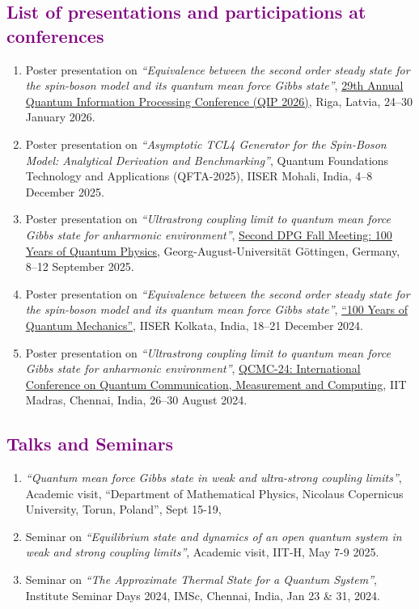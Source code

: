 \documentclass[a4paper,11pt]{article}
\newcommand{\sectionheading}[1]{\subsection*{\textcolor{purple}{#1}}}
\begin{document}
\sectionheading{List of presentations and participations at conferences}
\begin{enumerate}
  \item Poster presentation on \textit{``Equivalence between the second order steady state for the spin-boson model and its quantum mean force Gibbs state''}, \href{https://qip2026.lu.lv/}{29th Annual Quantum Information Processing Conference (QIP 2026)}, Riga, Latvia, 24--30 January 2026.
  \item Poster presentation on \textit{``Asymptotic TCL4 Generator for the Spin-Boson Model: Analytical Derivation and Benchmarking''}, Quantum Foundations Technology and Applications (QFTA-2025), IISER Mohali, India, 4--8 December 2025.
  \item Poster presentation on \textit{``Ultrastrong coupling limit to quantum mean force Gibbs state for anharmonic environment''}, \href{https://quantum25.dpg-tagungen.de/}{Second DPG Fall Meeting: 100 Years of Quantum Physics}, Georg-August-Universität Göttingen, Germany, 8--12 September 2025.
  \item Poster presentation on \textit{``Equivalence between the second order steady state for the spin-boson model and its quantum mean force Gibbs state''}, \href{https://www.iiserkol.ac.in/~qm100/}{``100 Years of Quantum Mechanics''}, IISER Kolkata, India, 18--21 December 2024.
  \item Poster presentation on \textit{``Ultrastrong coupling limit to quantum mean force Gibbs state for anharmonic environment''}, \href{https://quantum.iitm.ac.in/qcmc24/}{QCMC-24: International Conference on Quantum Communication, Measurement and Computing}, IIT Madras, Chennai, India, 26--30 August 2024.
\end{enumerate}

\sectionheading{Talks and Seminars}
\begin{enumerate}
    \item {\it ``Quantum mean force Gibbs state in weak and ultra-strong coupling limits''}, Academic visit, ``Department of Mathematical Physics, Nicolaus Copernicus University, Torun, Poland'', Sept 15-19,
    \item Seminar on {\it ``Equilibrium state and dynamics of an open quantum system in weak and strong coupling limits''}, Academic visit, IIT-H, May 7-9 2025.
    \item Seminar on {\it ``The Approximate Thermal State for a Quantum System''}, Institute Seminar Days 2024, IMSc, Chennai, India, Jan 23 \& 31, 2024.
\end{enumerate}
\end{document}
